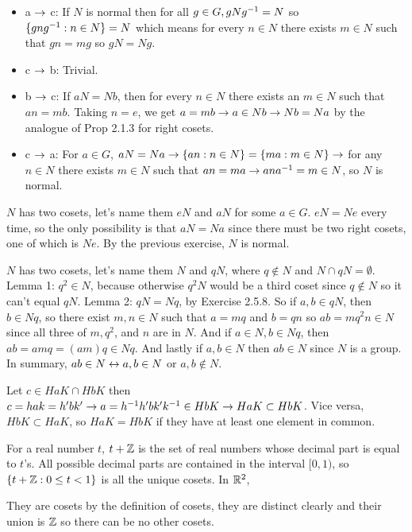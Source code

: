\documentclass[11pt, oneside]{article}   	%
\begin{document}
\item \begin{itemize}
\item a $\rightarrow$ c: If $N$ is normal then for all $g \in G, gNg^{-1} = N$ so $ \{gng^{-1}:n\in N\} = N $ which means for every $n\in N$ there exists $m \in N$ such that $gn = mg$ so $gN = Ng$.
\item c $\rightarrow$ b: Trivial.
\item b $\rightarrow$ c: If $aN = Nb$, then for every $n \in N$ there exists an $m \in N$ such that $an = mb$. Taking $n=e$, we get $a = mb \rightarrow a \in Nb \rightarrow Nb = Na$ by the analogue of Prop 2.1.3 for right cosets.
\item c $\rightarrow$ a: For $a \in G$, $aN = Na \rightarrow \{an:n \in N\} = \{ma:m \in N\} \rightarrow $ for any $n \in N$ there exists $m \in N$ such that $an = ma \rightarrow ana^{-1} = m \in N$, so $N$ is normal.
\end{itemize} 
\item $N$ has two cosets, let's name them $eN$ and $aN$ for some $a \in G$. $eN = Ne$ every time, so the only possibility is that $aN = Na$ since there must be two right cosets, one of which is $Ne$. By the previous exercise, $N$ is normal.
\item $N$ has two cosets, let's name them $N$ and $qN$, where $q \not \in N$ and $N \cap qN = \emptyset$. Lemma 1: $q^2 \in N$, because otherwise $q^2N$ would be a third coset since $q \not \in N$ so it can't equal $qN$. Lemma 2: $qN = Nq$, by Exercise 2.5.8. So if $a, b \in qN$, then $b \in Nq$, so there exist $m, n \in N$ such that $a = mq$ and $b = qn$ so $ab = mq^2n \in N$ since all three of $m, q^2$, and $n$ are in $N$. And if $a \in N, b \in Nq$, then $ab = amq = (am)q \in Nq$. And lastly if $a, b \in N$ then $ab \in N$ since $N$ is a group. In summary, $ab \in N \leftrightarrow a, b \in N$ or $a, b \not \in N$.
\item Let $c \in HaK \cap HbK$ then $c = hak = h'bk' \rightarrow a = h^{-1} h'bk'k^{-1} \in HbK \rightarrow HaK \subset HbK$. Vice versa, $HbK \subset HaK$, so $HaK = HbK$ if they have at least one element in common.
\item For a real number $t$, $t + \mathbb{Z}$ is the set of real numbers whose decimal part is equal to $t$'s. All possible decimal parts are contained in the interval $[0, 1)$, so $\{t + \mathbb{Z}: 0 \le t < 1\}$ is all the unique cosets. In $\mathbb{R}^2$, 
\item They are cosets by the definition of cosets, they are distinct clearly and their union is $\mathbb{Z}$ so there can be no other cosets.
\item \be
\end{document}
